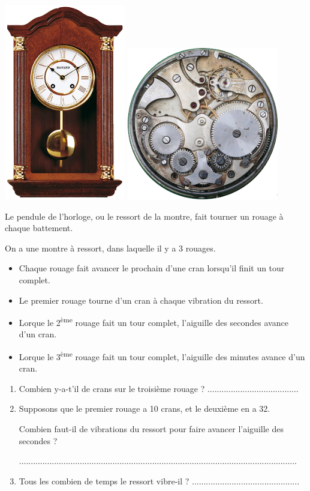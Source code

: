 \documentclass[a4paper,11pt]{article}
\begin{document}
\begin{attention}[frametitle={Comment ça fonctionne ?}]
	\begin{center}
		\includegraphics[width=0.2\linewidth]{Images/horloge mécanique.png}
		\includegraphics[width=0.3\linewidth]{Images/montre mécanique.png}
	\end{center}

	Le pendule de l'horloge, ou le ressort de la montre, fait tourner un rouage à chaque battement.
\end{attention}

On a une montre à ressort, dans laquelle il y a 3 rouages.
\begin{itemize}
	\item Chaque rouage fait avancer le prochain d'une cran lorsqu'il finit un tour complet.
	\item Le premier rouage tourne d'un cran à chaque vibration du ressort.
	\item Lorque le 2\textsuperscript{ème} rouage fait un tour complet, l'aiguille des secondes avance d'un cran.
	\item Lorque le 3\textsuperscript{ème} rouage fait un tour complet, l'aiguille des minutes avance d'un cran.
\end{itemize}
\begin{enumerate}
	\item Combien y-a-t'il de crans sur le troisième rouage ? .......................................
	\item Supposons que le premier rouage a 10 crans, et le deuxième en a 32.

	      Combien faut-il de vibrations du ressort pour faire avancer l'aiguille des secondes ? \vspace{0.5em}

	      ....................................................................................................................... \vspace{0.5em}

	\item Tous les combien de temps le ressort vibre-il ? ..............................................
\end{enumerate}
\end{document}
